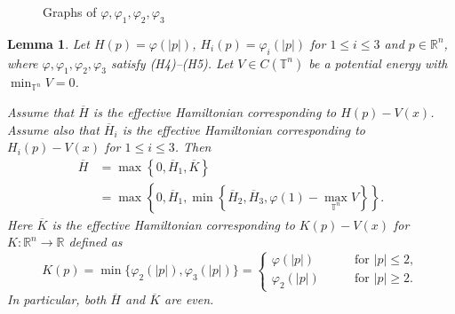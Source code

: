 \documentclass[12pt,reqno]{amsart}
\theoremstyle{plain}
\newtheorem{lem}[thm]{Lemma}
\theoremstyle{remark}
\numberwithin{equation}{section}
\newcommand{\R}{\mathbb{R}}
\newcommand{\T}{\mathbb{T}}
\newcommand{\ol}{\overline}
\begin{document}
\begin{figure}[h]
\begin{center}
\caption{Graphs of $\varphi, \varphi_1, \varphi_2, \varphi_3$}
\label{fig3}
\end{center}
\end{figure}



\begin{lem} \label{thm:rep2}
Let $H(p)=\varphi(|p|)$, $H_i(p)=\varphi_i(|p|)$ for $1 \leq i \leq 3$ and $p \in \R^n$,
where $\varphi,\varphi_1,\varphi_2, \varphi_3$ satisfy {\rm (H4)--(H5)}.
Let $V \in C(\T^n)$ be a potential energy with $\min_{\T^n} V=0$.

Assume that $\ol{H}$ is the effective Hamiltonian corresponding to $H(p)-V(x)$.
Assume also that $\ol{H}_i$ is the effective Hamiltonian corresponding to $H_i(p)- V(x)$ for $1 \leq i \leq 3$.
Then
\[
\begin{array}{ll}
\ol{H} &=\max\left\{0, \ol{H}_1, \ol{K}\right\}\\[5mm]
&= \max\left\{0, \ol{H}_1, \min\left\{\ol{H}_2, \ol{H}_3, \varphi(1)-\max_{\T^n} V \right\} \right\}.
\end{array}
\]
Here $\ol{K}$ is the effective Hamiltonian corresponding to $K(p)- V(x)$ for $K:\R^n \to \R$ defined as
\[
K(p)=\min\{\varphi_2(|p|), \varphi_3(|p|)\}=
\begin{cases}
\varphi(|p|) \qquad &\text{for } |p| \leq 2,\\
\varphi_2(|p|) \qquad &\text{for } |p| \geq 2.
\end{cases}
\]
In particular, both $\ol H$ and $\ol K$ are even. 

\end{lem}
\end{document}
